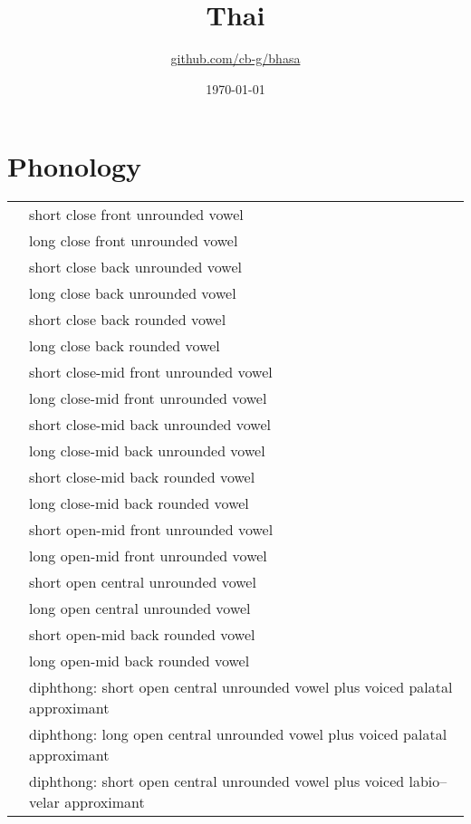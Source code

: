 \documentclass{article}
\title{Thai\\\ipa{[p\super h\=a:s\v{a}:t\super h\=aj]}}
\author{\href{https://github.com/cb-g/bhasa}{github.com/cb-g/bhasa}}
\date{\today}
\begin{document}
\pagecolor{custom_bg}\color{custom_fg}
\maketitle\thispagestyle{empty}

\newpage\setcounter{page}{1}\section{Phonology}

\begin{xltabular}{\textwidth}{lL}
   & short close front unrounded vowel \\
   & long close front unrounded vowel \\
   & short close back unrounded vowel \\
   & long close back unrounded vowel \\
   & short close back rounded vowel \\
   & long close back rounded vowel \\
   & short close-mid front unrounded vowel \\
   & long close-mid front unrounded vowel \\
   & short close-mid back unrounded vowel \\
   & long close-mid back unrounded vowel \\
   & short close-mid back rounded vowel \\
   & long close-mid back rounded vowel \\
   & short open-mid front unrounded vowel \\
   & long open-mid front unrounded vowel \\
   & short open central unrounded vowel \\
   & long open central unrounded vowel \\
   & short open-mid back rounded vowel \\
   & long open-mid back rounded vowel \\
   & diphthong: short open central unrounded vowel plus voiced palatal approximant \\
   & diphthong: long open central unrounded vowel plus voiced palatal approximant \\
   & diphthong: short open central unrounded vowel plus voiced labio–velar approximant \\

\end{xltabular}
\end{document}
